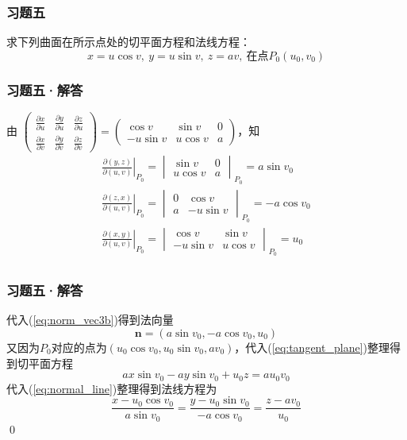 \begin{frame}
    \frametitle{习题五}

    求下列曲面在所示点处的切平面方程和法线方程：
    $$x=u\cos v,\ y=u\sin v,\ z=av,\ \text{在点}P_0(u_0,v_0)$$

\end{frame}

\begin{frame}
    \frametitle{习题五·解答}

    由%
    $\left(\begin{smallmatrix}
        \frac{\partial x}{\partial u} & \frac{\partial y}{\partial u} & \frac{\partial z}{\partial u} \\
        \frac{\partial x}{\partial v} & \frac{\partial y}{\partial v} & \frac{\partial z}{\partial v}
    \end{smallmatrix}\right)=\left(\begin{smallmatrix}
        \cos v & \sin v & 0 \\
        -u \sin v & u \cos v & a
    \end{smallmatrix}\right)$，知\pause
    \begin{gather*}
        \left.\frac{\partial(y,z)}{\partial(u,v)}\right|_{P_0}=\begin{vmatrix}\sin v&0\\u\cos v&a\end{vmatrix}_{P_0}=a\sin v_0\\
        \left.\frac{\partial(z,x)}{\partial(u,v)}\right|_{P_0}=\begin{vmatrix}0&\cos v\\a&-u\sin v\end{vmatrix}_{P_0}=-a\cos v_0\\
        \left.\frac{\partial(x,y)}{\partial(u,v)}\right|_{P_0}=\begin{vmatrix}\cos v&\sin v\\-u\sin v&u\cos v\end{vmatrix}_{P_0}=u_0\\
    \end{gather*}

\end{frame}

\begin{frame}
    \frametitle{习题五·解答}

    代入(\ref{eq:norm_vec3b})得到法向量
    $$\boldsymbol{n}=\left(a\sin v_0,-a\cos v_0,u_0\right)$$\pause
    又因为$P_0$对应的点为$\left(u_0\cos v_0,u_0\sin v_0,av_0\right)$，代入(\ref{eq:tangent_plane})整理得到切平面方程
    $$ax\sin v_0-ay\sin v_0+u_0z=au_0v_0$$\pause
    代入(\ref{eq:normal_line})整理得到法线方程为
    $$\frac{x-u_0\cos v_0}{a\sin v_0}=\frac{y-u_0\sin v_0}{-a\cos v_0}=\frac{z-av_0}{u_0}$$
    \qed

\end{frame}